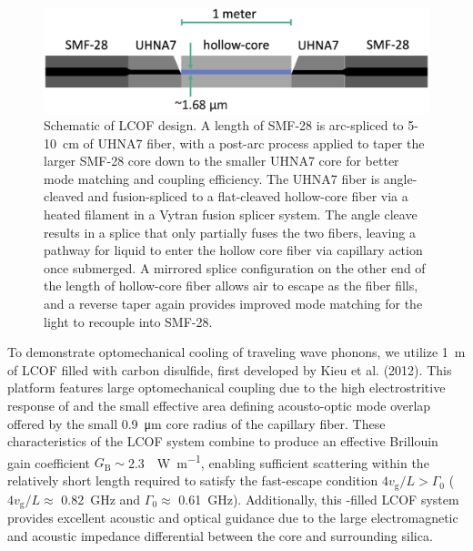 \begin{figure}[t]
  \centering
  \includegraphics[width=\textwidth]{figs/3-Cooling/LCOFdiagram.png}
  \caption{Schematic of \ac{LCOF} design. A length of \ac{SMF-28} is arc-spliced to 5-\SI{10}{\centi\meter} of \ac{UHNA7} fiber, with a post-arc process applied to taper the larger \ac{SMF-28} core down to the smaller \ac{UHNA7} core for better mode matching and coupling efficiency. The \ac{UHNA7} fiber is angle-cleaved and fusion-spliced to a flat-cleaved hollow-core fiber via a heated filament in a Vytran fusion splicer system. The angle cleave results in a splice that only partially fuses the two fibers, leaving a pathway for liquid to enter the hollow core fiber via capillary action once submerged. A mirrored splice configuration on the other end of the length of hollow-core fiber allows air to escape as the fiber fills, and a reverse taper again provides improved mode matching for the light to recouple into \ac{SMF-28}.}
  \label{fig:LCOF diagram}
\end{figure}

To demonstrate optomechanical cooling of traveling wave phonons, we utilize \SI{1}{\meter} of \acl{LCOF} filled with carbon disulfide, first developed by Kieu et al. (2012). \cite{kieu2012integrated} This platform features large optomechanical coupling due to the high electrostritive response of  \cite{boyd2020nonlinear} and the small effective area defining acousto-optic mode overlap offered by the small \SI{0.9}{\micro\meter} core radius of the capillary fiber. These characteristics of the \ac{LCOF} system combine to produce an effective Brillouin gain coefficient \(G_{\mathrm{B}} \sim\)\SI{2.3}{\per\watt\per\meter}, enabling sufficient scattering within the relatively short length required to satisfy the fast-escape condition \(4v_{\mathrm{g}}/L > \Gamma_{\mathrm{0}}\) (\(4v_{\mathrm{g}}/L \approx\) \SI{0.82}{\giga\hertz} and \(\Gamma_{\mathrm{0}} \approx\) \SI{0.61}{\giga\hertz}). \cite{johnson2023laser} Additionally, this -filled \ac{LCOF} system provides excellent acoustic and optical guidance due to the large electromagnetic and acoustic impedance differential between the  core and surrounding silica. \cite{behunin2019spontaneous}

